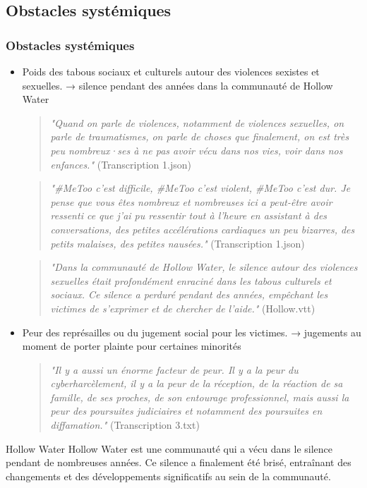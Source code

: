 \documentclass[french]{beamer}
\begin{document}
\subsection{Obstacles systémiques}
\begin{frame}
  \frametitle{Obstacles systémiques}
  \begin{itemize}
    \item Poids des tabous sociaux et culturels autour des violences sexistes et sexuelles. → silence pendant des années dans la communauté de Hollow Water
      \begin{quote}
        \textit{"Quand on parle de violences, notamment de violences sexuelles, on parle de traumatismes, on parle de choses que finalement, on est très peu nombreux·ses à ne pas avoir vécu dans nos vies, voir dans nos enfances."} (Transcription 1.json)
      \end{quote}
      \begin{quote}
        \textit{"#MeToo c'est difficile, #MeToo c'est violent, #MeToo c'est dur. Je pense que vous êtes nombreux et nombreuses ici a peut-être avoir ressenti ce que j'ai pu ressentir tout à l'heure en assistant à des conversations, des petites accélérations cardiaques un peu bizarres, des petits malaises, des petites nausées."} (Transcription 1.json)
        \end{quote}
      \begin{quote}
        \textit{"Dans la communauté de Hollow Water, le silence autour des violences sexuelles était profondément enraciné dans les tabous culturels et sociaux. Ce silence a perduré pendant des années, empêchant les victimes de s'exprimer et de chercher de l'aide."} (Hollow.vtt)
      \end{quote}
    \item Peur des représailles ou du jugement social pour les victimes. → jugements au moment de porter plainte pour certaines minorités
      \begin{quote}
        \textit{"Il y a aussi un énorme facteur de peur. Il y a la peur du cyberharcèlement, il y a la peur de la réception, de la réaction de sa famille, de ses proches, de son entourage professionnel, mais aussi la peur des poursuites judiciaires et notamment des poursuites en diffamation."} (Transcription 3.txt)
      \end{quote}
  \end{itemize}
  \begin{block}{Hollow Water}
    Hollow Water est une communauté qui a vécu dans le silence pendant de nombreuses années. Ce silence a finalement été brisé, entraînant des changements et des développements significatifs au sein de la communauté.
  \end{block}
\end{frame}
\end{document}
